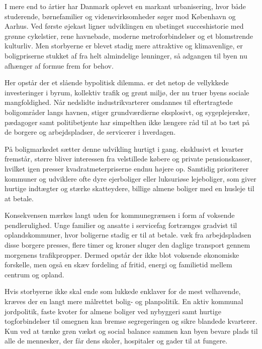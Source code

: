 I mere end to årtier har Danmark oplevet en markant urbanisering, hvor både studerende, børnefamilier og vidensvirksomheder søger mod København og Aarhus. Ved første øjekast ligner udviklingen en ubetinget succeshistorie med grønne cykelstier, rene havnebade, moderne metroforbindelser og et blomstrende kulturliv. Men  storbyerne er blevet stadig mere attraktive og klimavenlige, er boligpriserne stukket af fra helt almindelige lønninger, så adgangen til byen nu afhænger af formue frem for behov.

Her opstår der et slående bypolitisk dilemma.  er det netop de vellykkede investeringer i byrum, kollektiv trafik og grønt miljø, der nu truer byens sociale mangfoldighed. Når nedslidte industrikvarterer omdannes til eftertragtede boligområder langs havnen, stiger grundværdierne eksplosivt, og sygeplejersker, pædagoger samt politibetjente har simpelthen ikke længere råd til at bo tæt på de borgere og arbejdspladser, de servicerer i hverdagen.

På boligmarkedet sætter denne udvikling hurtigt  i gang.  eksklusivt et kvarter fremstår,  større bliver interessen fra velstillede købere og private pensionskasser, hvilket igen presser kvadratmeterpriserne endnu højere op. Samtidig prioriterer kommuner og udviklere ofte dyre ejerboliger eller luksuriøse lejeboliger, som giver hurtige indtægter og stærke skatteydere,  billige almene boliger med en husleje til at betale.

Konsekvensen mærkes langt uden for kommunegrænsen i form af voksende pendlerulighed. Unge familier og ansatte i servicefag fortrænges gradvist til oplandskommuner, hvor boligerne stadig er til at betale.  væk fra arbejdspladsen disse borgere presses,  flere timer og kroner sluger den daglige transport gennem morgenens trafikpropper. Dermed opstår der ikke blot voksende økonomiske forskelle, men også en skæv fordeling af fritid, energi og familietid mellem centrum og opland.

Hvis storbyerne ikke skal ende som lukkede enklaver for de mest velhavende, kræves der en langt mere målrettet bolig- og planpolitik. En aktiv kommunal jordpolitik, faste kvoter for almene boliger ved nybyggeri samt hurtige togforbindelser til omegnen kan bremse segregeringen og sikre blandede kvarterer. Kun ved at tænke grøn vækst og social balance sammen kan byen bevare plads til alle de mennesker, der får dens skoler, hospitaler og gader til at fungere.

